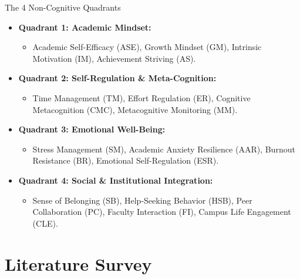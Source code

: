 \documentclass{beamer}
\begin{document}
\begin{frame}{The 4 Non-Cognitive Quadrants}
  \begin{itemize}\setlength{\itemsep}{6pt}
    \item \textbf{Quadrant 1: Academic Mindset:}
    \begin{itemize}
      \item Academic Self-Efficacy (ASE), Growth Mindset (GM), Intrinsic Motivation (IM), Achievement Striving (AS).
    \end{itemize}
    \item \textbf{Quadrant 2: Self-Regulation \& Meta-Cognition:}
    \begin{itemize}
      \item Time Management (TM), Effort Regulation (ER), Cognitive Metacognition (CMC), Metacognitive Monitoring (MM).
    \end{itemize}
    \item \textbf{Quadrant 3: Emotional Well-Being:}
    \begin{itemize}
      \item Stress Management (SM), Academic Anxiety Resilience (AAR), Burnout Resistance (BR), Emotional Self-Regulation (ESR).
    \end{itemize}
    \item \textbf{Quadrant 4: Social \& Institutional Integration:}
    \begin{itemize}
      \item Sense of Belonging (SB), Help-Seeking Behavior (HSB), Peer Collaboration (PC), Faculty Interaction (FI), Campus Life Engagement (CLE).
    \end{itemize}
  \end{itemize}
\end{frame}

\section{Literature Survey}
\end{document}
